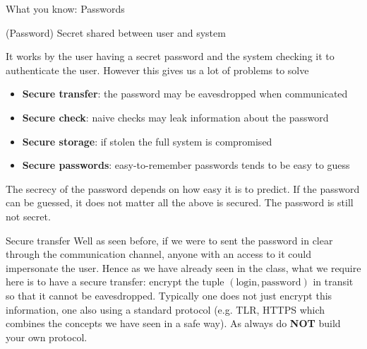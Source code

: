 \begin{parag}{What you know: Passwords}
	\begin{definition}{(Password)}
    Secret shared between user and system
    \end{definition}
	It works by the user having a secret password and the system checking it to authenticate the user. However this gives us a lot of problems to solve 
	\begin{itemize}
	    \item \textbf{Secure transfer}: the password may be eavesdropped when communicated
	    \item \textbf{Secure check}: naive checks may leak information about the password
	    \item \textbf{Secure storage}: if stolen the full system is compromised
	    \item \textbf{Secure passwords}: easy-to-remember passwords tends to be easy to guess
	\end{itemize}
	The secrecy of the password depends on how easy it is to predict. If the password can be guessed, it does not matter all the above is secured. The password is still not secret.
\end{parag}

\begin{parag}{Secure transfer}
    Well as seen before, if we were to sent the password in clear through the communication channel, anyone with an access to it could impersonate the user. Hence as we have already seen in the class, what we require here is to have a secure transfer: encrypt the tuple $\left(\text{login}, \text{password}\right)$ in transit so that it cannot be eavesdropped. Typically one does not just encrypt this information, one also  using a standard protocol (e.g. TLR, HTTPS which combines the concepts we have seen in a safe way). As always do \textbf{NOT} build your own protocol.
\end{parag}


